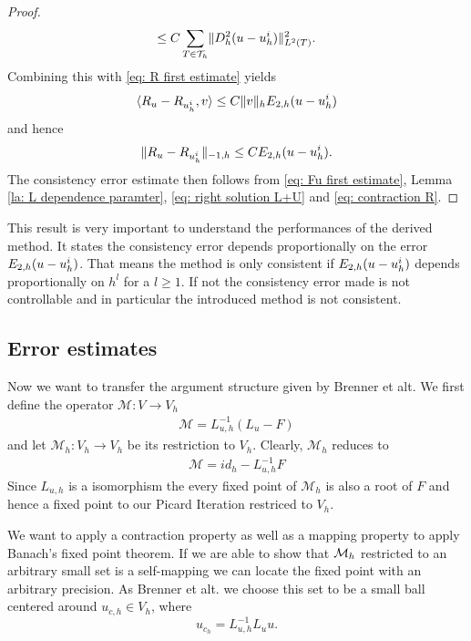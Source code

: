 \begin{proof}
\begin{align}
	\leq C \sum_{T \in \mathcal{T}_h} \lVert D_h^2 (u-u_h^i) \rVert_{L^2(T)}^2.
	\end{align}
	Combining this with \eqref{eq: R first estimate} yields
	\begin{align*}
	 \langle R_u - R_{u^i_h}, v \rangle \leq C \lVert v \rVert_{h} E_{2,h}(u-u_h^i)
	\end{align*}
	and hence 
	\begin{align}
	\lVert R_u - R_{u^i_h} \rVert_{-1,h} \leq C E_{2,h}(u-u_h^i). \label{eq: contraction R}
	\end{align}
	The consistency error estimate then follows from \eqref{eq: Fu first estimate}, Lemma \ref{la: L dependence paramter}, \eqref{eq: right solution L+U} and \eqref{eq: contraction R}.
\end{proof}

This result is very important to understand the performances of the derived method. It states the consistency error depends proportionally on the error $E_{2,h}(u-u^i_h)$. That means the method is only consistent if $E_{2,h}(u-u^i_h)$ depends proportionally on $h^l$ for a $l \geq 1$. If not the consistency error made is not controllable and in particular the introduced method is not consistent.

\subsection{Error estimates}
Now we want to transfer the argument structure given by Brenner et alt. We first define the operator $\mathcal M: V \rightarrow V_h$
\begin{align}
	\mathcal M = L_{u,h}^{-1}(L_{u} - F)
\end{align}
and let $\mathcal M_h:V_h \rightarrow V_h$ be its restriction to $V_h$. Clearly, $\mathcal M_h$ reduces to 
\begin{align}
\mathcal M = id_h - L_{u,h}^{-1}F
\end{align}
Since $L_{u,h}$ is a isomorphism the every fixed point of $\mathcal M_h$ is also a root of $F$ and hence a fixed point to our Picard Iteration restriced to $V_h$.

We want to apply a contraction property as well as a mapping property to apply Banach's fixed point theorem. If we are able to show that $\mathcal M_h$ restricted to an arbitrary small set is a self-mapping we can locate the fixed point with an arbitrary precision. As Brenner et alt. we choose this set to be a small ball centered around $u_{c,h}\in V_h$, where
\[
u_{c_h} = L_{u,h}^{-1} L_u u.
\]


